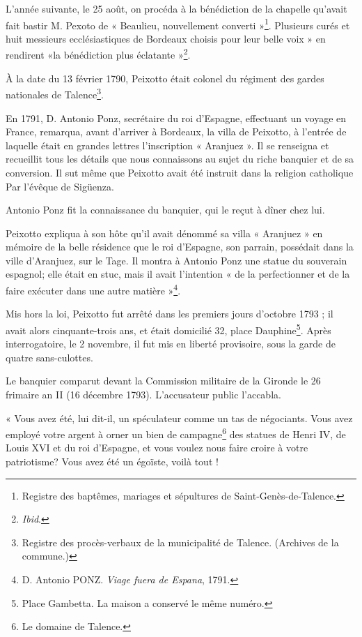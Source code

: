 L'année suivante, le 25 août, on procéda à la bénédiction de la chapelle qu'avait fait bastir M. Pexoto de « Beaulieu, nouvellement converti »\footnote{Registre des baptêmes, mariages et sépultures de Saint-Genès-de-Talence.}. Plusieurs curés et huit messieurs ecclésiastiques de Bordeaux choisis pour leur belle voix » en rendirent «la bénédiction plus éclatante »\footnote{\textit{Ibid}.}.

À la date du 13 février 1790, Peixotto était colonel du régiment des gardes nationales de Talence\footnote{Registre des procès-verbaux de la municipalité de Talence. (Archives de la commune.)}.

En 1791, D. Antonio Ponz, secrétaire du roi d'Espagne, effectuant un voyage en France, remarqua, avant d'arriver à Bordeaux, la villa de Peixotto, à l'entrée de laquelle était en grandes lettres l'inscription « Aranjuez ». Il se renseigna et recueillit tous les détails que nous connaissons au sujet du riche banquier et de sa conversion. Il sut même que Peixotto avait été instruit dans la religion catholique Par l'évêque de Sigüenza.

Antonio Ponz fit la connaissance du banquier, qui le reçut à dîner chez lui.

Peixotto expliqua à son hôte qu'il avait dénommé sa villa « Aranjuez » en mémoire de la belle résidence que le roi d'Espagne, son parrain, possédait dans la ville d'Aranjuez, sur le Tage. Il montra à Antonio Ponz une statue du souverain espagnol; elle était en stuc, mais il avait l'intention « de la perfectionner et de la faire exécuter dans une autre matière »\footnote{D. Antonio PONZ. \textit{Viage fuera de Espana}, 1791.}.

Mis hors la loi, Peixotto fut arrêté dans les premiers jours d'octobre 1793 ; il avait alors cinquante-trois ans, et était domicilié 32, place Dauphine\footnote{Place Gambetta. La maison a conservé le même numéro.}. Après interrogatoire, le 2 novembre, il fut mis en liberté provisoire, sous la garde de quatre sans-culottes.

Le banquier comparut devant la Commission militaire de la Gironde le 26 frimaire an II (16 décembre 1793). L'accusateur public l'accabla.

« Vous avez été, lui dit-il, un spéculateur comme un tas de négociants. Vous avez employé votre argent à orner un bien de campagne\footnote{Le domaine de Talence.} des statues de Henri IV, de Louis XVI et du roi d'Espagne, et vous voulez nous faire croire à votre patriotisme? Vous avez été un égoïste, voilà tout ! 

